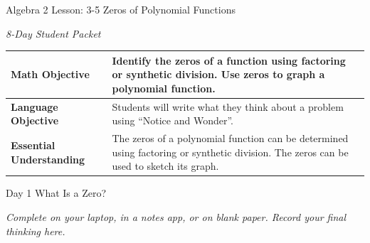 \documentclass[10pt]{article}
\newcommand{\dayheading}[3]{%
  \begin{tcolorbox}[enhanced, colback=dayblue, colframe=dayblue,
    arc=0pt, left=8pt, right=8pt, top=5pt, bottom=5pt,
    fontupper=\Large\bfseries\sffamily\color{white}]
    Day #1 \;\textbar\; #2
  \end{tcolorbox}
  \vspace{1pt}
  {\small\itshape #3}%
}
\begin{document}

\begin{center}
  {\LARGE Algebra 2 Lesson: 3-5 Zeros of Polynomial Functions}

  \vspace{2pt}
  {\normalsize\textit{8-Day Student Packet}}
\end{center}

\vspace{-2pt}

\begin{center}
\renewcommand{\arraystretch}{1.35}
\begin{tabular}{|>{\centering\arraybackslash}m{1.15in}|m{5.6in}|}
\hline
\textbf{Math Objective} &
Identify the zeros of a function using factoring or synthetic division. Use zeros to graph a polynomial function. \\
\hline
\textbf{Language Objective} &
Students will write what they think about a problem using ``Notice and Wonder''. \\
\hline
\textbf{Essential Understanding} &
The zeros of a polynomial function can be determined using factoring or synthetic division. The zeros can be used to sketch its graph. \\
\hline
\end{tabular}
\end{center}

\vspace{10pt}


\dayheading{1}{What Is a Zero?}{Complete on your laptop, in a notes app, or on blank paper. Record your final thinking here.}

\vspace{4pt}
\end{document}
